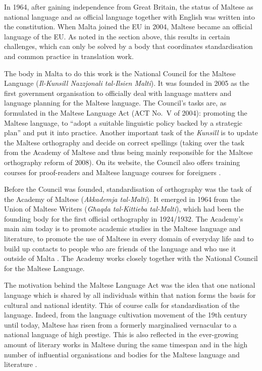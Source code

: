 \begin{multicols}{2}
In 1964, after gaining independence from Great Britain, the status of Maltese as national language and as official language together with English was written into the constitution. When Malta joined the EU in 2004, Maltese became an official language of the EU. As noted in the section above, this results in certain challenges, which can only be solved by a body that coordinates standardisation and common practice in translation work.

The body in Malta to do this work is the National Council for the Maltese Language (\emph{Il-Kunsill Nazzjonali tal-Ilsien Malti}). It was founded in 2005 as the first government organisation to officially deal with language matters and language planning for the Maltese language. The Council's tasks are, as formulated in the Maltese Language Act (ACT No.~V of 2004): promoting the Maltese language, to ``adopt a suitable linguistic policy backed by a strategic plan'' and put it into practice. Another important task of the \emph{Kunsill} is to update the Maltese orthography and decide on correct spellings (taking over the task from the Academy of Maltese and thus being mainly responsible for the Maltese orthography reform of 2008). On its website, the Council also offers training courses for proof-readers and Maltese language courses for foreigners \cite{Kunsill1}. 

Before the Council was founded, standardisation of orthography was the task of the Academy of Maltese (\emph{Akkademja tal-Malti}). It emerged in 1964 from the Union of Maltese Writers (\emph{Għaqda tal-Kittieba tal-Malti}), which had been the founding body for the first official orthography in 1924/1932. The Academy's main aim today is to promote academic studies in the Maltese language and literature, to promote the use of Maltese in every domain of everyday life and to build up contacts to people who are friends of the language and who use it outside of Malta \cite{Akkademja1}. The Academy works closely together with the National Council for the Maltese Language.

The motivation behind the Maltese Language Act was the idea that one national language which is shared by all individuals within that nation forms the basis for cultural and national identity. This of course calls for standardisation of the language. Indeed, from the language cultivation movement of the 19th century until today, Maltese has risen from a formerly marginalised vernacular to a national language of high prestige. This is also reflected in the ever-growing amount of literary works in Maltese during the same timespan and in the high number of influential organisations and bodies for the Maltese language and literature \cite{Fabri:2011a}.


\end{multicols}
